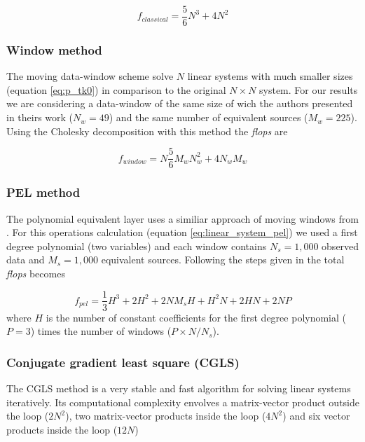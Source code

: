 \begin{equation}
	f_{classical} = \dfrac{5}{6} N^3 + 4N^2
\label{flops_classical}
\end{equation}

\subsubsection{Window method \citep{leao-silva1989}}

The moving data-window scheme \citep{leao-silva1989} solve $N$ linear systems with much smaller sizes (equation \ref{eq:p_tk0}) in comparison to the original $N \times N$ system. For our results we are considering a data-window of the same size of wich the authors presented in theirs work ($N_w = 49$) and the same number of equivalent sources ($M_w = 225$). Using the Cholesky decomposition with this method the \textit{flops} are

\begin{equation}
	f_{window} = N\dfrac{5}{6} M_w N_w^2 + 4N_w M_w
\label{flops_leao-silva}
\end{equation}

\subsubsection{PEL method \citep{oliveirajr-etal2013}}

The polynomial equivalent layer uses a similiar approach of moving windows from \cite{leao-silva1989}. For this operations calculation (equation \ref{eq:linear_system_pel}) we used a first degree polynomial (two variables) and each window contains $N_s = 1,000$ observed data and $M_s = 1,000$ equivalent sources. Following the steps given in \citep{oliveirajr-etal2013} the total \textit{flops} becomes

\begin{equation}
	f_{pel} = \dfrac{1}{3} H^3 + 2H^2 + 2NM_sH + H^2N + 2HN + 2NP
\label{flops_pel}
\end{equation}
where $H$ is the number of constant coefficients for the first degree polynomial ($P = 3$) times the number of windows  ($P \times N/N_s$).

\subsubsection{Conjugate gradient least square (CGLS)}

The CGLS method is a very stable and fast algorithm for solving linear systems iteratively. Its computational complexity envolves a matrix-vector product outside the loop ($2N^2$), two matrix-vector products inside the loop ($4N^2$) and six vector products inside the loop ($12N$) \citep{aster2018parameter}


